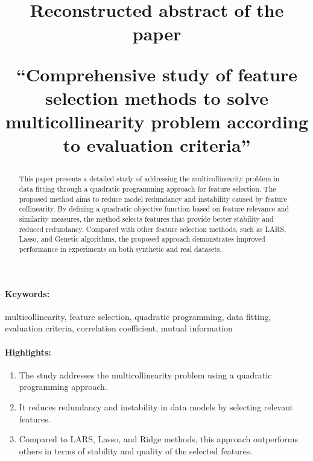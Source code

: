 \documentclass[12pt]{article}
\title{Reconstructed abstract of the paper 

``Comprehensive study of feature selection methods to solve multicollinearity problem according to evaluation criteria''}
\date{}
\begin{document}
\maketitle

\begin{abstract}
This paper presents a detailed study of addressing the multicollinearity problem in data fitting through a quadratic programming approach for feature selection. The proposed method aims to reduce model redundancy and instability caused by feature collinearity. By defining a quadratic objective function based on feature relevance and similarity measures, the method selects features that provide better stability and reduced redundancy. Compared with other feature selection methods, such as LARS, Lasso, and Genetic algorithms, the proposed approach demonstrates improved performance in experiments on both synthetic and real datasets.
\end{abstract}

\paragraph{Keywords:} multicollinearity, feature selection, quadratic programming, data fitting, evaluation criteria, correlation coefficient, mutual information

\paragraph{Highlights:}
\begin{enumerate}
    \item The study addresses the multicollinearity problem using a quadratic programming approach.
    \item It reduces redundancy and instability in data models by selecting relevant features.
    \item Compared to LARS, Lasso, and Ridge methods, this approach outperforms others in terms of stability and quality of the selected features.
\end{enumerate}
\end{document}

